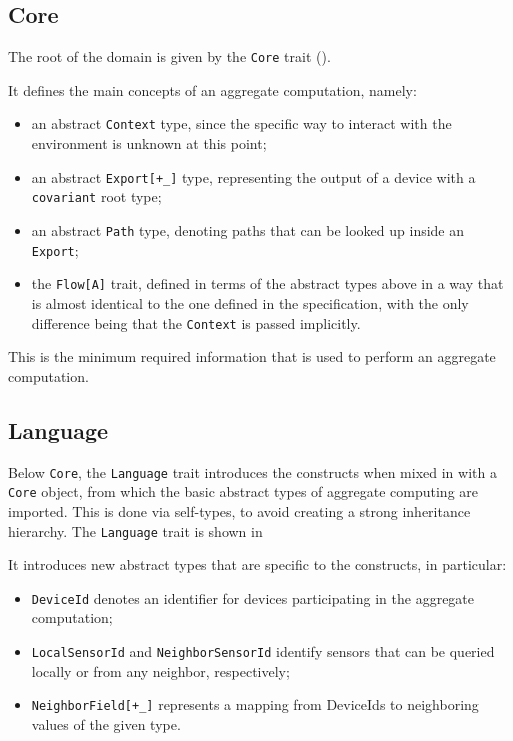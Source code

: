 \subsection{Core}

The root of the domain is given by the \texttt{Core} trait ().
%

%
It defines the main concepts of an aggregate computation, namely:
%
\begin{itemize}
    \item an abstract \texttt{Context} type, since the specific way to interact with the environment is unknown at this point;
    \item an abstract \texttt{Export[+\_]} type, representing the output of a device with a \texttt{covariant} root type;
    \item an abstract \texttt{Path} type, denoting paths that can be looked up inside an \texttt{Export};
    \item the \texttt{Flow[A]} trait, defined in terms of the abstract types above in a way that is almost identical to the one defined in the specification, with the only difference being that the \texttt{Context} is passed implicitly.
\end{itemize}
%
This is the minimum required information that is used to perform an aggregate computation.

\subsection{Language}

Below \texttt{Core}, the \texttt{Language} trait introduces the constructs when mixed in with a \texttt{Core} object, from which the basic abstract types of aggregate computing are imported.
%
This is done via self-types, to avoid creating a strong inheritance hierarchy.
%
The \texttt{Language} trait is shown in 
%

%
It introduces new abstract types that are specific to the constructs, in particular:
%
\begin{itemize}
    \item \texttt{DeviceId} denotes an identifier for devices participating in the aggregate computation;
    \item \texttt{LocalSensorId} and \texttt{NeighborSensorId} identify sensors that can be queried locally or from any neighbor, respectively;
    \item \texttt{NeighborField[+\_]} represents a mapping from DeviceIds to neighboring values of the given type.
\end{itemize}


